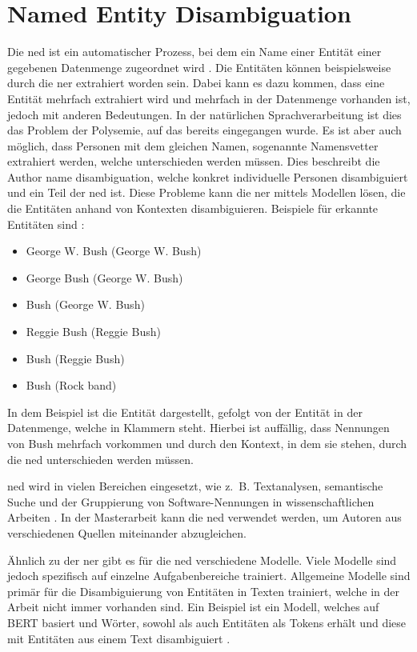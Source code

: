 \section{Named Entity Disambiguation}
\label{sec:author-name-disambiguation}
Die \gls{ned} ist ein automatischer Prozess, bei dem ein Name einer Entität einer gegebenen Datenmenge zugeordnet wird \autocites{cucerzan_large-scale_2007}{yamada_global_2022}.
Die Entitäten können beispielsweise durch die \gls{ner} extrahiert worden sein.
Dabei kann es dazu kommen, dass eine Entität mehrfach extrahiert wird und mehrfach in der Datenmenge vorhanden ist, jedoch mit anderen Bedeutungen.
In der natürlichen Sprachverarbeitung ist dies das Problem der Polysemie, auf das bereits eingegangen wurde.
Es ist aber auch möglich, dass Personen mit dem gleichen Namen, sogenannte Namensvetter extrahiert werden, welche unterschieden werden müssen.
Dies beschreibt die Author name disambiguation, welche konkret individuelle Personen disambiguiert und ein Teil der \gls{ned} ist.
Diese Probleme kann die \gls{ner} mittels Modellen lösen, die die Entitäten anhand von Kontexten disambiguieren.
Beispiele für erkannte Entitäten sind \autocite{cucerzan_large-scale_2007}:

\begin{itemize}
  \item George W. Bush (George W. Bush)
  \item George Bush (George W. Bush)
  \item Bush (George W. Bush)
  \item Reggie Bush (Reggie Bush)
  \item Bush (Reggie Bush)
  \item Bush (Rock band)
\end{itemize}

In dem Beispiel ist die Entität dargestellt, gefolgt von der Entität in der Datenmenge, welche in Klammern steht.
Hierbei ist auffällig, dass Nennungen von \glqq Bush\grqq{} mehrfach vorkommen und durch den Kontext, in dem sie stehen, durch die \gls{ned} unterschieden werden müssen.

\gls{ned} wird in vielen Bereichen eingesetzt, wie z. B. Textanalysen, semantische Suche und der Gruppierung von Software-Nennungen in wissenschaftlichen Arbeiten \autocites{cucerzan_large-scale_2007}{yamada_global_2022}{schindler_somesci-_2021}.
In der Masterarbeit kann die \gls{ned} verwendet werden, um Autoren aus verschiedenen Quellen miteinander abzugleichen.

Ähnlich zu der \gls{ner} gibt es für die \gls{ned} verschiedene Modelle.
Viele Modelle sind jedoch spezifisch auf einzelne Aufgabenbereiche trainiert.
Allgemeine Modelle sind primär für die Disambiguierung von Entitäten in Texten trainiert, welche in der Arbeit nicht immer vorhanden sind.
Ein Beispiel ist ein Modell, welches auf BERT basiert und Wörter, sowohl als auch Entitäten als Tokens erhält und diese mit Entitäten aus einem Text disambiguiert \autocite{yamada_global_2022}.
